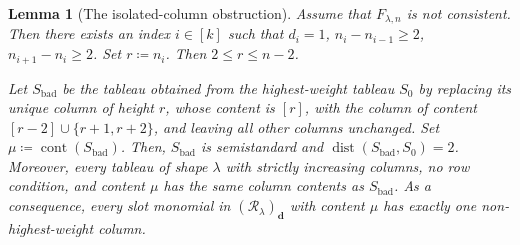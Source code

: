 \documentclass[a4paper,reqno]{amsart}
\theoremstyle{plainnopunct}
\newtheorem{lemma}[lemma]{Lemma}
\theoremstyle{definitionnopunct}
\newcommand{\cR}{\mathcal{R}}
\newcommand{\dist}{\operatorname{dist}}
\newcommand{\bd}{\mathbf{d}}
\DeclareMathOperator{\cont}{cont}
\begin{document}
\begin{lemma}[The isolated-column obstruction]
\label{lem: isolated column obstruction}
Assume that $F_{\lambda,n}$ is not consistent. Then there exists an
index $i\in[k]$ such that $d_i=1$, $n_i-n_{i-1}\geq2$, $n_{i+1}-n_i\geq2$.
Set $r\coloneq n_i$.
Then $2\leq r\leq n-2$.

Let $S_{\mathrm{bad}}$ be the tableau obtained from the highest-weight
tableau $S_0$ by replacing its unique column of height $r$, whose
content is $[r]$, with the column of content $[r-2]\cup\{r+1,r+2\}$,
and leaving all other columns unchanged. Set $\mu
\coloneq
\cont(S_{\mathrm{bad}})$. Then, $S_{\mathrm{bad}}$ is semistandard and $\dist(S_{\mathrm{bad}},S_0)=2$.
Moreover, every tableau of shape $\lambda$ with strictly increasing
columns, no row condition, and content $\mu$ has the same column
contents as $S_{\mathrm{bad}}$. As a consequence, every slot monomial in
$(\cR_\lambda)_{\bd}$ with content $\mu$ has exactly one
non-highest-weight column.
\end{lemma}
\end{document}
